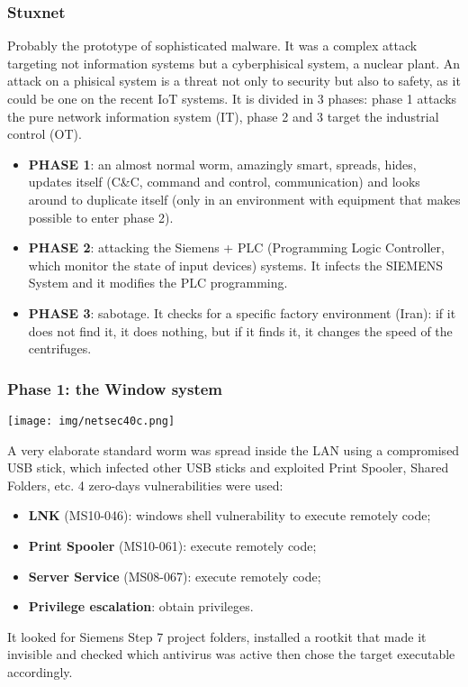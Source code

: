 \documentclass[a4paper, 10pt, titlepage]{article}
\begin{document}
\subsubsection{Stuxnet}
Probably the prototype of sophisticated malware. It was a complex attack targeting not information systems but a cyberphisical system, a nuclear plant. An attack on a phisical system is a threat not only to security but also to safety, as it could be one on the recent IoT systems. It is divided in 3 phases: phase 1 attacks the pure network information system (IT), phase 2 and 3 target the industrial control (OT).
\begin{itemize}
	\item \textbf{PHASE 1}: an almost normal worm, amazingly smart, spreads, hides, updates itself (C\&C, command and control, communication) and looks around to duplicate itself (only in an environment with equipment that makes possible to enter phase 2).
	\item \textbf{PHASE 2}: attacking the Siemens + PLC (Programming Logic Controller, which monitor the state of input devices) systems. It infects the SIEMENS System and it modifies the PLC programming.
	\item \textbf{PHASE 3}: sabotage. It checks for a specific factory environment (Iran): if it does not find it, it does nothing, but if it finds it, it changes the speed of the centrifuges.
\end{itemize}

\subsubsection*{Phase 1: the Window system}
\begin{minipage}{0.35\textwidth}
	\begin{center}
		\texttt{[image: img/netsec40c.png]}
	\end{center}
\end{minipage}
\hfill
\begin{minipage}{0.6\textwidth}
A very elaborate standard worm was spread inside the LAN using a compromised USB stick, which infected other USB sticks and exploited Print Spooler, Shared Folders, etc.
4 zero-days vulnerabilities were used:
\begin{itemize}
	\item \textbf{LNK} (MS10-046): windows shell vulnerability to execute remotely code;
	\item \textbf{Print Spooler} (MS10-061): execute remotely code;
	\item \textbf{Server Service} (MS08-067): execute remotely code;
	\item \textbf{Privilege escalation}: obtain privileges.
\end{itemize}
It looked for Siemens Step 7 project folders, installed a rootkit that made it invisible and checked which antivirus was active then chose the target executable accordingly.
\end{minipage}
\end{document}
